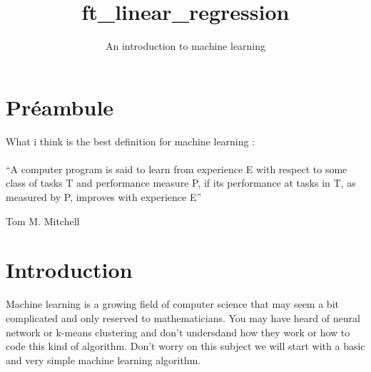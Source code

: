 \documentclass{42}
\begin{document}
                           \title{ft\_linear\_regression}
                          \subtitle{An introduction to machine learning}


\maketitle

\tableofcontents


\chapter{Préambule}

	What i think is the best definition for machine learning : \\\\
	``A computer program is said to learn from experience E with respect to some class of tasks T and performance measure P, if its performance at tasks in T, as measured by P, improves with experience E'' \\
	\begin{flushright}Tom M. Mitchell\end{flushright}

\chapter{Introduction}

	Machine learning is a growing field of computer science that may seem a bit complicated and only reserved to mathematicians. You may have heard of neural network or k-means clustering and don't undersdand how they work or how to code this kind of algorithm. Don't worry on this subject we will start with a basic and very simple machine learning algorithm.
\end{document}
